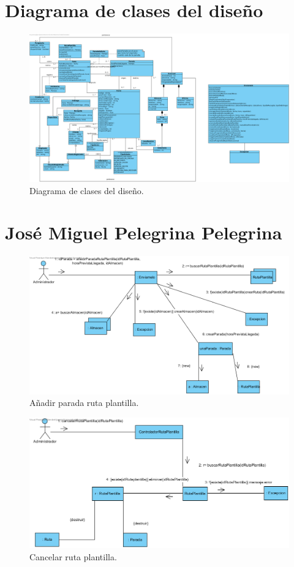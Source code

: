 \documentclass[12pt,spanish]{article}
\begin{document}
\section{Diagrama de clases del diseño}

\begin{figure}[H]
\centering
\includegraphics[scale=0.35]{diseno.png}
\caption{Diagrama de clases del diseño.}
\end{figure}

\section{José Miguel Pelegrina Pelegrina}

\begin{figure}[H]
\centering
\includegraphics[scale=0.5]{aniadirParadaRutaPlantilla.png}
\caption{Añadir parada ruta plantilla.}
\end{figure}

\begin{figure}[H]
\centering
\includegraphics[scale=0.5]{cancelarRutaPlantilla.png}
\caption{Cancelar ruta plantilla.}
\end{figure}
\end{document}
